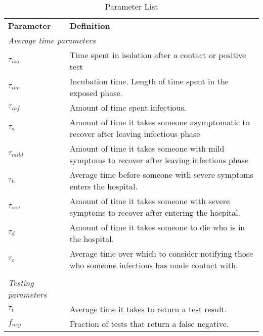 \documentclass{article}
\begin{document}
\begin{table}[]
\caption{Parameter List}
\label{tab:parameters}
\begin{tabular}{ll}
\textbf{Parameter}          & \textbf{Definition}                                                                                \\
\multicolumn{2}{l}{\textit{Average time parameters}}                                                                             \\
$\tau_{iso}$                & Time spent in isolation after a contact or positive test                                           \\
$\tau_{inc}$                & Incubation time. Length of time spent in the exposed phase.                                        \\
$\tau_{inf}$                & Amount of time spent infectious.                                                                   \\
$\tau_{a}$                  & Amount of time it takes someone asymptomatic to recover after leaving infectious phase             \\
$\tau_{mild}$               & Amount of time it takes someone with mild symptoms to recover after leaving infectious phase       \\
$\tau_{h}$                  & Average time before someone with severe symptoms enters the hospital.                              \\
$\tau_{sev}$                & Amount of time it takes someone with severe symptoms to recover after entering the hospital.       \\
$\tau_{d}$                  & Amount of time it takes someone to die who is in the hospital.                                     \\
$\tau_{c}$          & Average time over which to consider notifying those who someone infectious has made contact with.        \\
                            &                                                                                                    \\
\textit{Testing parameters} &                                                                                                    \\
$\tau_{t}$                  & Average time it takes to return a test result.                                                     \\
$f_{neg}$                   & Fraction of tests that return a false negative.                                                    \\

\end{tabular}
\end{table}
\end{document}
